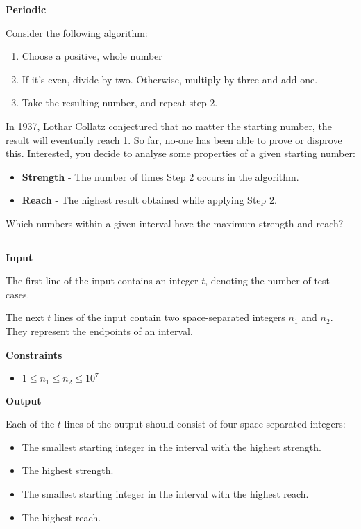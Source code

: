 \LARGE \textbf{Periodic} \normalsize

Consider the following algorithm:

\begin{enumerate}
    \item Choose a positive, whole number
    \item If it's even, divide by two. Otherwise, multiply by three and add one.
    \item Take the resulting number, and repeat step 2.
\end{enumerate}

In 1937, Lothar Collatz conjectured that no matter the starting number, the result will eventually reach 1. So far, no-one has been able to prove or disprove this.
Interested, you decide to analyse some properties of a given starting number:

\begin{itemize}
    \item \textbf{Strength} - The number of times Step 2 occurs in the algorithm.
    \item \textbf{Reach} - The highest result obtained while applying Step 2.
\end{itemize}

Which numbers within a given interval have the maximum strength and reach?

\vspace{8pt}
\hrule

\textbf{Input}

The first line of the input contains an integer $t$, denoting the number of test cases.

The next $t$ lines of the input contain two space-separated integers $n_1$ and $n_2$. They represent the endpoints of an interval.

\textbf{Constraints}

\begin{itemize}
    \item $1 \leq n_1 \leq n_2 \leq 10^7$
\end{itemize}

\textbf{Output}

Each of the $t$ lines of the output should consist of four space-separated integers:

\begin{itemize}
    \item The smallest starting integer in the interval with the highest strength.
    \item The highest strength.
    \item The smallest starting integer in the interval with the highest reach.
    \item The highest reach.
\end{itemize}

